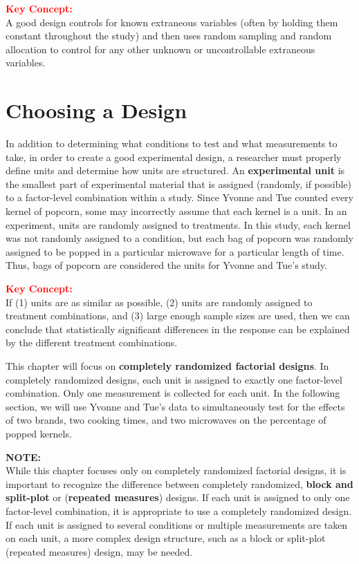\documentclass[
]{report}
\begin{document}
\textbf{\textcolor{red}{Key Concept:}}\\
\color{red}
A good design controls for known extraneous variables (often by holding them constant throughout
the study) and then uses random sampling and random allocation to control for any other unknown or
uncontrollable extraneous variables.
\color{black}
\normalsize

\hypertarget{choosing-a-design}{%
\section*{Choosing a Design}\label{choosing-a-design}}

In addition to determining what conditions to test and what measurements to take, in order to create a good experimental design, a researcher must properly define units and determine how units are structured. An \textbf{experimental unit} is the smallest part of experimental material that is assigned (randomly, if possible) to a factor-level combination within a study. Since Yvonne and Tue counted every kernel of popcorn, some may incorrectly assume that each kernel is a unit. In an experiment, units are randomly assigned to treatments. In this study, each kernel was not randomly assigned to a condition, but each bag of popcorn was randomly assigned to be popped in a particular microwave for a particular length of time. Thus, bags of popcorn are considered the units for Yvonne and Tue's study.

\large

\textbf{\textcolor{red}{Key Concept:}}\\
\color{red}
If (1) units are as similar as possible, (2) units are randomly assigned to treatment combinations, and (3) large enough sample sizes are used, then we can conclude that statistically significant differences in the response can be explained by the different treatment combinations.
\color{black}
\normalsize

This chapter will focus on \textbf{completely randomized factorial designs}. In completely randomized designs, each unit is assigned to exactly one factor-level combination. Only one measurement is collected for each unit. In the following section, we will use Yvonne and Tue's data to simultaneously test for the effects of two brands, two cooking times, and two microwaves on the percentage of popped kernels.

\large

\textbf{NOTE:}\\
While this chapter focuses only on completely randomized factorial designs, it is important to recognize the difference between completely randomized, \textbf{block and split-plot} or (\textbf{repeated measures}) designs. If each unit is assigned to only one factor-level combination, it is appropriate to use a completely randomized design. If each unit is assigned to several conditions or multiple measurements are taken on each unit, a more complex design structure, such as a block or split-plot (repeated measures) design, may be needed.
\end{document}
